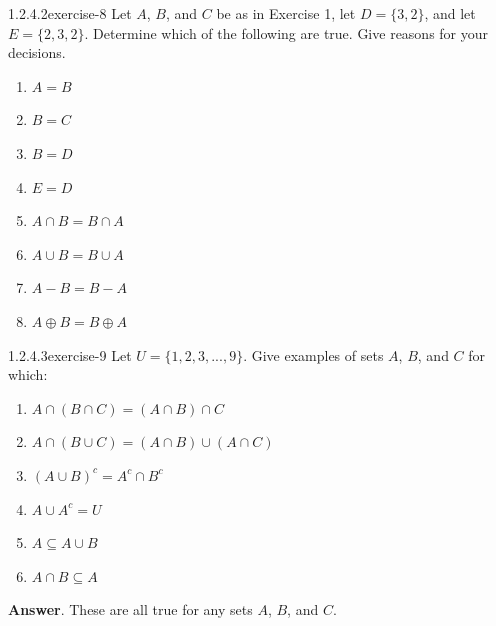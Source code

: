 \documentclass[twoside,10pt,]{book}
\numberwithin{equation}{section}
\begin{document}
\begin{divisionsolution}{1.2.4.2}{}{exercise-8}%
\hypertarget{p-291}{}%
Let \(A\), \(B\), and \(C\) be as in Exercise 1, let \(D = \{3, 2\}\), and let \(E = \{2, 3, 2\}\). Determine which of the following are true. Give reasons for your decisions.\leavevmode%
\begin{multicols}{2}
\begin{enumerate}[label=(\alph*)]
\item\hypertarget{li-229}{}\hypertarget{p-292}{}%
\(A = B\)%
\item\hypertarget{li-230}{}\hypertarget{p-293}{}%
\(B = C\)%
\item\hypertarget{li-231}{}\hypertarget{p-294}{}%
\(B = D\)%
\item\hypertarget{li-232}{}\hypertarget{p-295}{}%
\(E=D\)%
\item\hypertarget{li-233}{}\hypertarget{p-296}{}%
\(A\cap B = B\cap A\)%
\item\hypertarget{li-234}{}\hypertarget{p-297}{}%
\(A \cup  B = B \cup  A\)%
\item\hypertarget{li-235}{}\hypertarget{p-298}{}%
\(A-B = B-A\)%
\item\hypertarget{li-236}{}\hypertarget{p-299}{}%
\(A \oplus  B = B \oplus  A\)%
\end{enumerate}
\end{multicols}
%
\end{divisionsolution}%
\begin{divisionsolution}{1.2.4.3}{}{exercise-9}%
\hypertarget{p-300}{}%
Let \(U= \{1, 2, 3, . . . , 9\}\). Give examples of sets \(A\), \(B\), and \(C\) for which:\leavevmode%
\begin{multicols}{2}
\begin{enumerate}[label=(\alph*)]
\item\hypertarget{li-237}{}\hypertarget{p-301}{}%
\(A\cap (B\cap C)=(A\cap B)\cap C\)%
\item\hypertarget{li-238}{}\hypertarget{p-302}{}%
\(A\cap (B\cup C)=(A\cap B)\cup (A\cap C)\)%
\item\hypertarget{li-239}{}\hypertarget{p-303}{}%
\((A \cup  B)^c= A^c\cap B^c\)%
\item\hypertarget{li-240}{}\hypertarget{p-304}{}%
\(A \cup  A^c = U\)%
\item\hypertarget{li-241}{}\hypertarget{p-305}{}%
\(A \subseteq A\cup B\)%
\item\hypertarget{li-242}{}\hypertarget{p-306}{}%
\(A\cap B \subseteq A\)%
\end{enumerate}
\end{multicols}
%
\par\smallskip%
\noindent\textbf{Answer}.\quad%
\hypertarget{p-307}{}%
These are all true for any sets \(A\), \(B\), and \(C\).%
\end{divisionsolution}%
\end{document}
